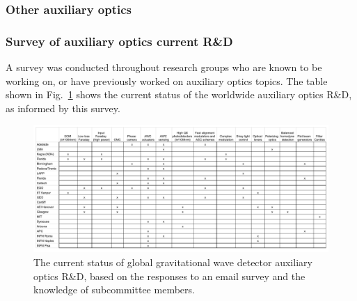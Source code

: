 
\subsubsection{Other auxiliary optics}

\subsubsection{Survey of auxiliary optics current R\&D}
A survey was conducted throughout research groups who are known to be working on, or have previously worked on auxiliary optics topics. The table shown in Fig.~\ref{fig:auxopticssurvey} shows the current status of the worldwide auxiliary optics R\&D, as informed by this survey. 
\begin{figure}[htb]
\centering
\includegraphics[width=\textwidth]{Figures/auxopticssurvey.pdf}
\caption{The current status of global gravitational wave detector auxiliary optics R\&D, based on the responses to an email survey and the knowledge of subcommittee members.}\label{fig:auxopticssurvey}
\end{figure}
%
